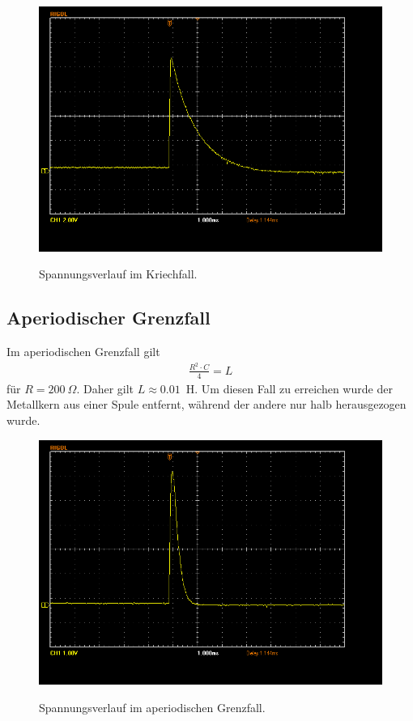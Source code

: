 \documentclass{article}
\begin{document}
\begin{figure}[H]
\caption{Spannungsverlauf im Kriechfall.}
\label{fig:kriech}
{\centering
\includegraphics[scale=0.4]{winkler/kriechfall.png}}
\end{figure}



\subsection{Aperiodischer Grenzfall}

Im aperiodischen Grenzfall gilt
\begin{align*}
\frac{R^2\cdot C}{4} = L
\end{align*}
für $R=200~\Omega$. Daher gilt $L\approx 0.01$~H. Um diesen Fall zu erreichen wurde der Metallkern aus einer Spule entfernt, während der andere nur halb herausgezogen wurde.

\begin{figure}[H]
\caption{Spannungsverlauf im aperiodischen Grenzfall.}
\label{fig:kriech}
{\centering
\includegraphics[scale=0.4]{winkler/aperiodischer_grenzfall.png}}
\end{figure}
\end{document}
